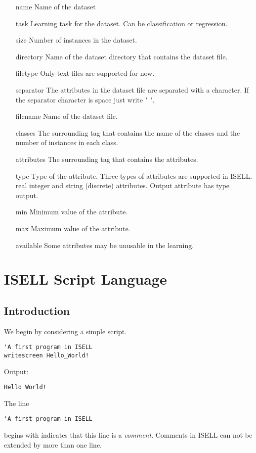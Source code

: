 \documentclass[a4paper,12pt]{book}
\begin{document}
\begin{itemize}
\item[name] Name of the dataset
\item[task] Learning task for the dataset. Can be classification or regression.
\item[size] Number of instances in the dataset.
\item[directory] Name of the dataset directory that contains the dataset file.
\item[filetype] Only text files are supported for now.
\item[separator] The attributes in the dataset file are separated with a character. If the separator character is space just write " ".
\item[filename] Name of the dataset file.
\item[classes] The surrounding tag that contains the name of the classes and the number of instances in each class.
\item[attributes] The surrounding tag that contains the attributes.
\item[type] Type of the attribute. Three types of attributes are supported in ISELL. real
 integer and string (discrete) attributes. Output attribute has type output.
\item[min] Minimum value of the attribute.
\item[max] Maximum value of the attribute.
\item[available] Some attributes may be unusable in the learning.
\end{itemize}

\chapter{ISELL Script Language}

\section{Introduction}
We begin by considering a simple script.
\begin{verbatim}
'A first program in ISELL
writescreen Hello_World!
\end{verbatim}
Output:
\begin{verbatim}
Hello World!
\end{verbatim}

The line
\begin{verbatim}
'A first program in ISELL
\end{verbatim}
begins with \' indicates that this line is a {\em comment}. Comments in ISELL can not be extended by more than one line. 
\end{document}
